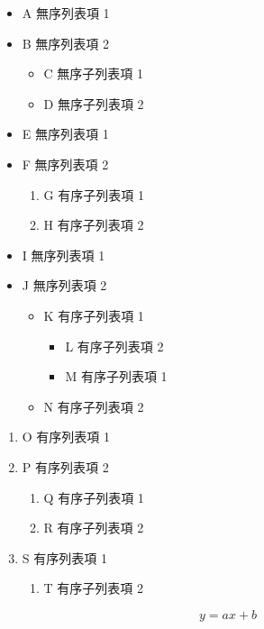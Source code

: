 \documentclass[12pt]{article}
\begin{document}
\begin{itemize}
	\item A 無序列表項 1
	\item B 無序列表項 2
	\begin{itemize}
		\item C 無序子列表項 1
		\item D 無序子列表項 2

	\end{itemize}
	\item E 無序列表項 1
	\item F 無序列表項 2
	\begin{enumerate}
		\item G 有序子列表項 1
		\item H 有序子列表項 2

	\end{enumerate}
	\item I 無序列表項 1
	\item J 無序列表項 2
	\begin{itemize}
		\item K 有序子列表項 1
		\begin{itemize}
			\item L 有序子列表項 2
			\item M 有序子列表項 1

		\end{itemize}
		\item N 有序子列表項 2

	\end{itemize}

\end{itemize}
\begin{enumerate}
	\item O 有序列表項 1
	\item P 有序列表項 2
	\begin{enumerate}
		\item Q 有序子列表項 1
		\item R 有序子列表項 2

	\end{enumerate}
	\item S 有序列表項 1
	\begin{enumerate}
		\item T 有序子列表項 2

	\end{enumerate}

\end{enumerate}

\begin{equation}
y = ax+b
\end{equation}
\end{document}
